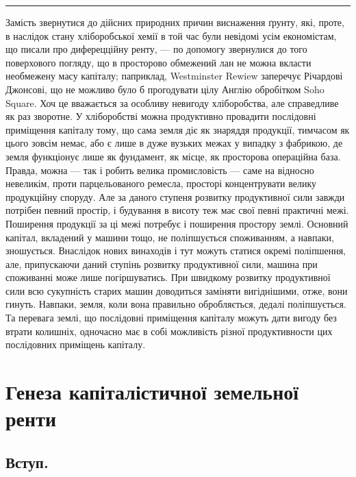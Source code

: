 \pfbreak

Замість звернутися до дійсних природних причин виснаження ґрунту, які,
проте, в наслідок стану хліборобської хемії в той час були невідомі усім економістам,
що писали про диферецційну ренту, — по допомогу звернулися до того
поверхового погляду, що в просторово обмежений лан не можна вкласти необмежену
масу капіталу; паприклад, Westminster Rewiew заперечує Річардові
Джонсові, що не можливо було б прогодувати цілу Англію обробітком Soho Square.
Хоч це вважається за особливу невигоду хліборобства, але справедливе як раз
зворотне. У хліборобстві можна продуктивно провадити послідовні приміщення
капіталу тому, що сама земля діє як знаряддя продукції, тимчасом як цього зовсім
немає, або є лише в дуже вузьких межах у випадку з фабрикою, де земля
функціонує лише як фундамент, як місце, як просторова операційна база. Правда,
можна — так і робить велика промисловість — саме на відносно невеликім, проти
парцельованого ремесла, просторі концентрувати велику продукційну споруду.
Але за даного ступеня розвитку продуктивної сили завжди потрібен певний простір,
і будування в висоту теж має свої певні практичні межі. Поширення продукції
за ці межі потребує і поширення простору землі. Основний капітал, вкладений
у машини тощо, не поліпшується споживанням, а навпаки, зношується. Внаслідок
нових винаходів і тут можуть статися окремі поліпшення, але, припускаючи
даний ступінь розвитку продуктивної сили, машина при споживанні може
лише погіршуватись. При швидкому розвитку продуктивної сили всю сукупність
старих машин доводиться заміняти вигіднішими, отже, вони гинуть. Навпаки,
земля, коли вона правильно обробляється, дедалі поліпшується. Та перевага
землі, що послідовні приміщення капіталу можуть дати вигоду без втрати колишніх,
одночасно має в собі можливість різної продуктивности цих послідовних
приміщень капіталу.

\section{Генеза капіталістичної земельної ренти}

\subsection{Вступ.}

